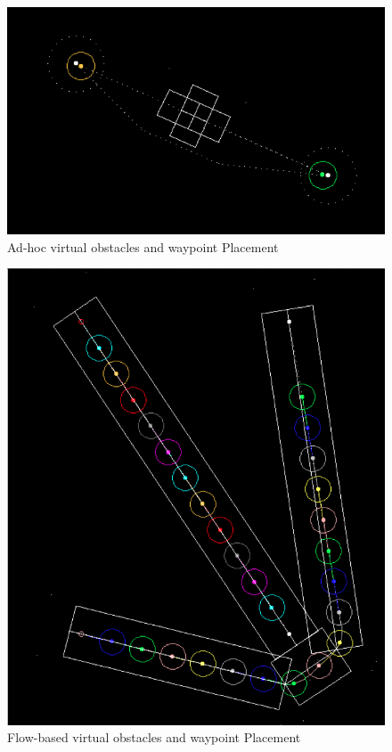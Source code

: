 \documentclass[10pt]{article}
\begin{document}
\begin{figure}[h!]
  \includegraphics[width=150mm]{wp.png}
  \caption{Ad-hoc virtual obstacles and waypoint Placement}
\label{fig:wp}
\end{figure}

\begin{figure}[h!]
  \includegraphics[width=150mm]{diagonal_flows.png}
  \caption{Flow-based virtual obstacles and waypoint Placement}
\label{fig:diagonal_flows}
\end{figure}
\end{document}
